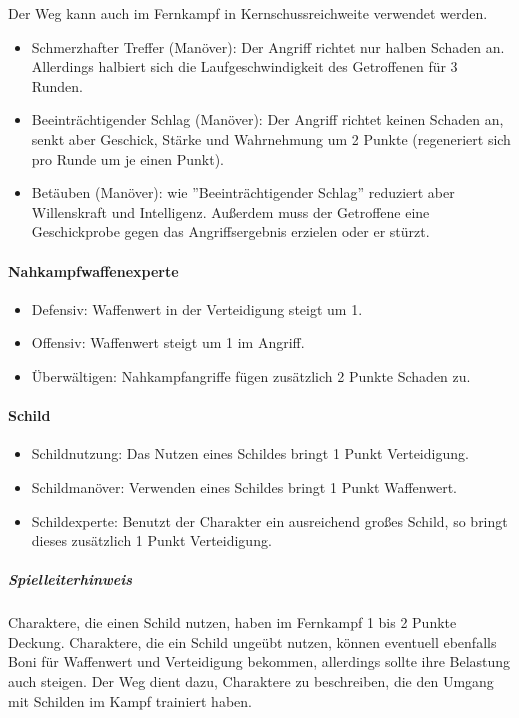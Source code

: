 \documentclass{article}
\begin{document}
Der Weg kann auch im Fernkampf in Kernschussreichweite verwendet werden.

\begin{itemize}
\item Schmerzhafter Treffer (Manöver): Der Angriff richtet nur halben Schaden an. Allerdings halbiert sich die Laufgeschwindigkeit des Getroffenen für 3 Runden.
\item Beeinträchtigender Schlag (Manöver): Der Angriff richtet keinen Schaden an, senkt aber Geschick, Stärke und Wahrnehmung um 2 Punkte (regeneriert sich pro Runde um je einen Punkt).
\item Betäuben (Manöver): wie ''Beeinträchtigender Schlag'' reduziert aber Willenskraft und Intelligenz. Außerdem muss der Getroffene eine Geschickprobe gegen das Angriffsergebnis erzielen oder er stürzt.
\end{itemize}

\paragraph{Nahkampfwaffenexperte}

\begin{itemize}
\item Defensiv: Waffenwert in der Verteidigung steigt um 1.
\item Offensiv: Waffenwert steigt um 1 im Angriff.
\item Überwältigen: Nahkampfangriffe fügen zusätzlich 2 Punkte Schaden zu.
\end{itemize}

\paragraph{Schild}

\begin{itemize}
\item Schildnutzung: Das Nutzen eines Schildes bringt 1 Punkt Verteidigung.
\item Schildmanöver: Verwenden eines Schildes bringt 1 Punkt Waffenwert.
\item Schildexperte: Benutzt der Charakter ein ausreichend großes Schild, so bringt dieses zusätzlich 1 Punkt Verteidigung.
\end{itemize}

\begin{mdframed}[hidealllines=true, backgroundcolor=black!10]
\subparagraph{Spielleiterhinweis}

Charaktere, die einen Schild nutzen, haben im Fernkampf 1  bis 2 Punkte Deckung. Charaktere, die ein Schild ungeübt
nutzen, können eventuell ebenfalls Boni für Waffenwert und Verteidigung bekommen, allerdings sollte ihre Belastung
auch steigen. Der Weg dient dazu, Charaktere zu beschreiben, die den Umgang mit Schilden im Kampf trainiert haben.

\end{mdframed}
\end{document}
